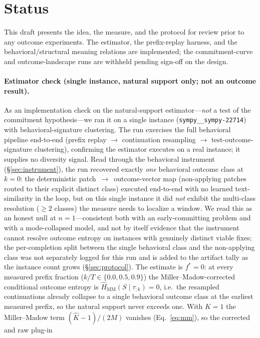 \documentclass[11pt]{article}
\newcommand{\strat}{S}
\newcommand{\prefix}{\tau_{:k}}
\begin{document}
\section*{Status}
This draft presents the idea, the measure, and the protocol for review prior to
any outcome experiments. The estimator, the prefix-replay harness, and the
behavioral/structural meaning relations are implemented; the commitment-curve and
outcome-landscape runs are withheld pending sign-off on the design.

\paragraph{Estimator check (single instance, natural support only; not an outcome
result).}
As an implementation check on the natural-support estimator---\emph{not} a test of
the commitment hypothesis---we ran it on a single instance
(\texttt{sympy\_\_sympy-22714}) with behavioral-signature clustering. The run
exercises the full behavioral pipeline end-to-end (prefix replay $\to$ continuation
resampling $\to$ test-outcome-signature clustering), confirming the estimator
executes on a real instance; it supplies no diversity signal. Read through the
behavioral instrument (\S\ref{sec:instrument}), the run recovered exactly
\emph{one} behavioral outcome class at $k\!=\!0$: the deterministic
patch~$\to$~outcome-vector map (non-applying patches routed to their explicit
distinct class) executed end-to-end with no learned text-similarity in the loop,
but on this single instance it did \emph{not} exhibit the multi-class resolution
($\geq\!2$ classes) the measure needs to localize a window. We read this as an
honest null at $n\!=\!1$---consistent both with an early-committing problem and
with a mode-collapsed model, and not by itself evidence that the instrument cannot
resolve outcome entropy on instances with genuinely distinct viable fixes; the
per-completion split between the single behavioral class and the non-applying class
was not separately logged for this run and is added to the artifact tally as the
instance count grows (\S\ref{sec:protocol}). The estimate
is $f^\ast=0$: at every measured prefix fraction ($k/T\in\{0.0,0.5,0.9\}$) the
Miller--Madow-corrected conditional outcome entropy is
$\widehat{H}_{\mathrm{MM}}(\strat\mid\prefix)=0$, i.e.\ the resampled continuations
already collapse to a single behavioral outcome class at the earliest measured
prefix, so the natural support never exceeds one. With $\hat K=1$ the Miller--Madow
term $(\hat K-1)/(2M)$ vanishes (Eq.~\eqref{eq:mm}), so the corrected and raw plug-in
\end{document}
